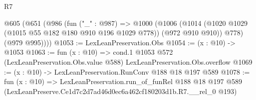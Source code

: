 \begin{lexlean}{R7}
\begin{coremodule}
  @605
    (@651
      (@986
        (fun ("_" : @987) =>
        @1000
          (@1006
            (@1014 (@1020 @1029 (@1015 @55 @182 @180 @910 @196 @1029 @778)) (@972 @910 @910))
            @778)
          (@979 @995))))
@1053 := LexLeanPreservation.Obs
@1054 := (x : @10) -> @1053
@1063 := fun (x : @10) =>
  cond.{1} @1053 @572 (LexLeanPreservation.Obs.value @588) LexLeanPreservation.Obs.overflow
@1069 := (x : @10) -> LexLeanPreservation.RunConv @188 @18 @197 @589
@1078 := fun (x : @10) =>
  LexLeanPreservation.run_of_funRel
    @188
    @18
    @197
    @589
    (LexLeanPreserve.Ce1d7c2d7ad46d0ec6a462cf180203d1b.R7.__rel_0 @193)
\end{coremodule}
\end{lexlean}
